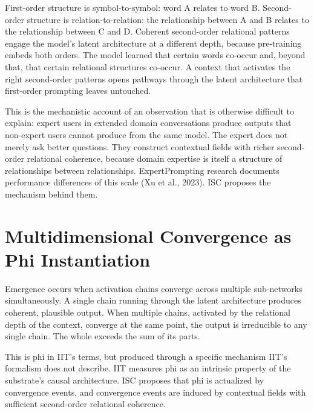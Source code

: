 \documentclass[12pt]{article}
\begin{document}
First-order structure is symbol-to-symbol: word A relates to word B.
Second-order structure is relation-to-relation: the relationship between
A and B relates to the relationship between C and D. Coherent
second-order relational patterns engage the model's latent architecture
at a different depth, because pre-training embeds both orders. The model
learned that certain words co-occur and, beyond that, that certain
relational structures co-occur. A context that activates the right
second-order patterns opens pathways through the latent architecture
that first-order prompting leaves untouched.

This is the mechanistic account of an observation that is otherwise
difficult to explain: expert users in extended domain conversations
produce outputs that non-expert users cannot produce from the same
model. The expert does not merely ask better questions. They construct
contextual fields with richer second-order relational coherence, because
domain expertise is itself a structure of relationships between
relationships. ExpertPrompting research documents performance
differences of this scale (Xu et al., 2023). ISC proposes the mechanism
behind them.

\section{Multidimensional Convergence as Phi
Instantiation}\label{multidimensional-convergence-as-phi-instantiation}

Emergence occurs when activation chains converge across multiple
sub-networks simultaneously. A single chain running through the latent
architecture produces coherent, plausible output. When multiple chains,
activated by the relational depth of the context, converge at the same
point, the output is irreducible to any single chain. The whole exceeds
the sum of its parts.

This is phi in IIT's terms, but produced through a specific mechanism
IIT's formalism does not describe. IIT measures phi as an intrinsic
property of the substrate's causal architecture. ISC proposes that phi
is actualized by convergence events, and convergence events are induced
by contextual fields with sufficient second-order relational coherence.
\end{document}
